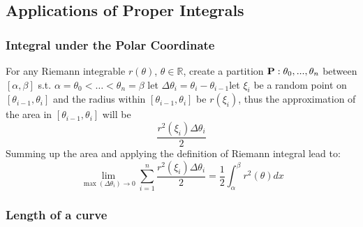 \documentclass{article}
\newcommand{\0}{{\bf{0}}}
\begin{document}
\subsection{Applications of Proper Integrals}
\subsubsection{Integral under the Polar Coordinate}
For any Riemann integrable $r(\theta)$, $\theta\in\mathbb{R}$, create a partition ${\bf{P}}:\theta_0,...,\theta_n$ between $[\alpha,\beta]$ s.t. $\alpha=\theta_0 <\dots< \theta_n=\beta$ let $\Delta\theta_i=\theta_i-\theta_{i-1}$let $\xi_i$ be a random point on $[\theta_{i-1},\theta_i]$ and the radius within $[\theta_{i-1},\theta_i]$ be $r(\xi_i)$, thus the approximation of the area in $[\theta_{i-1},\theta_i]$ will be $$\frac{r^2(\xi_i)\Delta\theta_i}{2}$$
Summing up the area and applying the definition of Riemann integral lead to:
$$\lim_{\max(\Delta\theta_i)\to0}\sum_{i=1}^{n}\frac{r^2(\xi_i)\Delta\theta_i}{2}=\frac{1}{2}\int_{\alpha}^{\beta}r^2(\theta)dx$$

\subsubsection{Length of a curve}
\end{document}
